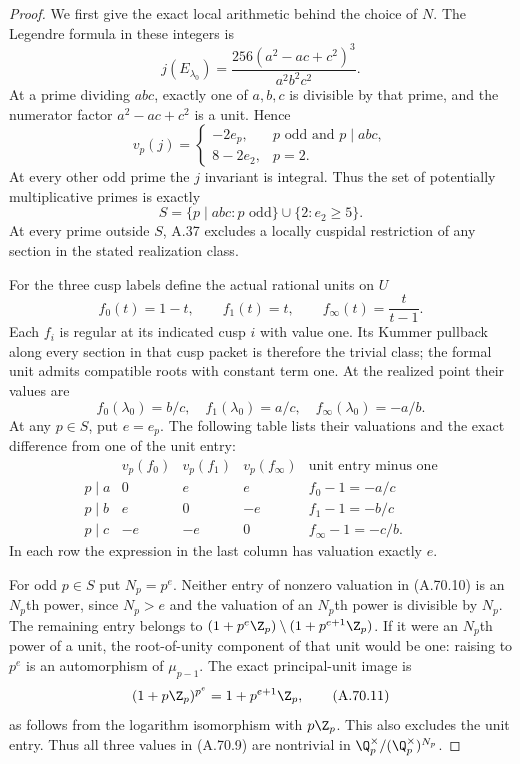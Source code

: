 \begin{proof}
We first give the exact local arithmetic behind the
choice of $N$.  The Legendre formula in these integers is
\[
             j(E_{\lambda_0})=
             \frac{256(a^2-ac+c^2)^3}{a^2b^2c^2}.
\tag{A.70.5}
\]
At a prime dividing $abc$, exactly one of $a,b,c$ is
divisible by that prime, and the numerator factor
$a^2-ac+c^2$ is a unit.  Hence
\[
 v_p(j)=
 \begin{cases}
       -2e_p,&p\text{ odd and }p\mid abc,\\
       8-2e_2,&p=2.
 \end{cases}
\tag{A.70.6}
\]
At every other odd prime the $j$ invariant is integral.
Thus the set of potentially multiplicative primes is
exactly
\[
 S=\{p\mid abc:p\text{ odd}\}
                 \cup\{2:e_2\ge5\}.
\tag{A.70.7}
\]
At every prime outside $S$, A.37 excludes a locally
cuspidal restriction of any section in the stated
realization class.

For the three cusp labels define the actual rational
units on $U$
\[
        f_0(t)=1-t,\qquad f_1(t)=t,\qquad
                        f_\infty(t)=\frac{t}{t-1}.
\tag{A.70.8}
\]
Each $f_i$ is regular at its indicated cusp $i$ with
value one.  Its Kummer pullback along every section in
that cusp packet is therefore the trivial class; the
formal unit admits compatible roots with constant
term one.  At the realized point their values are
\[
                  f_0(\lambda_0)=b/c,\quad
                  f_1(\lambda_0)=a/c,\quad
                  f_\infty(\lambda_0)=-a/b.
\tag{A.70.9}
\]
At any $p\in S$, put $e=e_p$.
The following table lists their valuations and the
exact difference from one of the unit entry:
\[
\begin{array}{c|ccc|c}
 &v_p(f_0)&v_p(f_1)&v_p(f_\infty)&
                         \text{unit entry minus one}\\ \hline
 p\mid a&0&e&e&f_0-1=-a/c\\
 p\mid b&e&0&-e&f_1-1=-b/c\\
 p\mid c&-e&-e&0&f_\infty-1=-c/b.
\end{array}
\tag{A.70.10}
\]
In each row the expression in the last column has
valuation exactly $e$.

For odd $p\in S$ put $N_p=p^e$.
Neither entry of nonzero valuation in (A.70.10) is
an $N_p$th power, since $N_p>e$ and the valuation
of an $N_p$th power is divisible by $N_p$.
The remaining entry belongs to
$(1+p^e\Z_p)\setminus(1+p^{e+1}\Z_p)$.
If it were an $N_p$th power of a unit, the
root-of-unity component of that unit would be one:
raising to $p^e$ is an automorphism of $\mu_{p-1}$.
The exact principal-unit image is
\[
             (1+p\Z_p)^{p^e}=1+p^{e+1}\Z_p,
\tag{A.70.11}
\]
as follows from the logarithm isomorphism with
$p\Z_p$.  This also excludes the unit entry.
Thus all three values in (A.70.9) are nontrivial
in $\Q_p^\times/(\Q_p^\times)^{N_p}$.


\end{proof}

